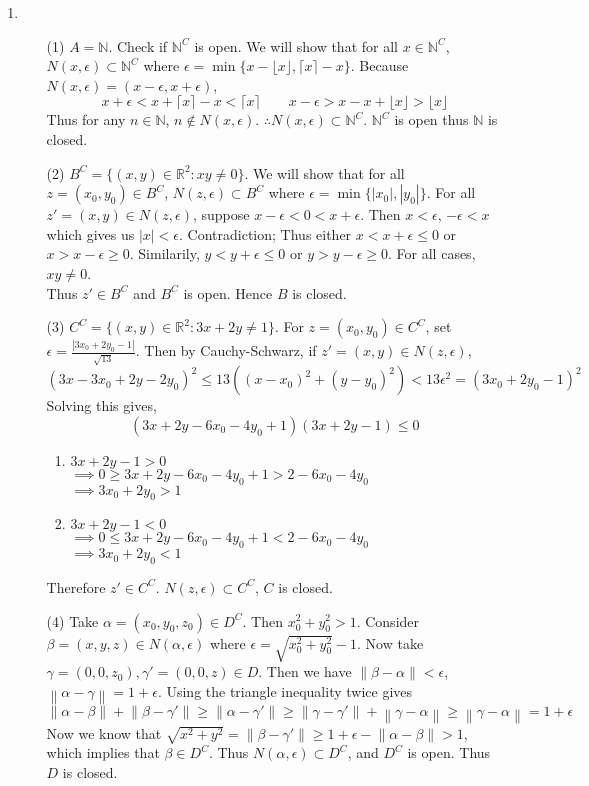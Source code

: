 \documentclass[12pt]{report}
\newcommand{\numl}[1]{\item[\large\textbf{\sffamily #1.}]}
\newcommand{\bb}[1]{\mathbb{#1}}
\newcommand{\norm}[1]{\left\lVert#1\right\rVert}
\newcommand{\abs}[1]{\left|#1\right|}
\newcommand{\ds}{\displaystyle}
\begin{document}
\begin{enumerate}
\numl{8}
\begin{enumerate}
	\item[(1)] $A = \bb{N}$. Check if $\bb{N}^C$ is open. We will show that for all $x\in \bb{N}^C$, $N(x, \epsilon)\subset \bb{N}^C$ where $\epsilon = \min\{x - \lfloor x \rfloor, \lceil x\rceil - x  \}$. Because $N(x, \epsilon) = (x - \epsilon, x +\epsilon)$,
	$$x + \epsilon < x + \lceil x\rceil - x < \lceil x\rceil \qquad x - \epsilon > x-x + \lfloor x \rfloor>  \lfloor x \rfloor $$
	Thus for any $n\in \bb{N}$, $n\notin N(x, \epsilon)$. $\therefore N(x, \epsilon) \subset \bb{N}^C$. $\bb{N}^C$ is open thus $\bb{N}$ is closed.
	\item [(2)] $B^C = \{(x, y)\in \bb{R}^2: xy\neq 0 \}$. We will show that for all $z = (x_0, y_0)\in B^C$, $N(z, \epsilon) \subset B^C$ where $\epsilon = \min\{\abs{x_0}, \abs{y_0} \}$.
	For all $z'=(x, y)\in N(z, \epsilon)$, suppose $x-\epsilon < 0 < x+ \epsilon$. Then $x < \epsilon$, $-\epsilon < x$ which gives us $\abs{x}<\epsilon$. Contradiction; Thus either $x <x +\epsilon \leq 0$ or $x > x - \epsilon \geq 0$. Similarily, $y < y +\epsilon \leq 0$ or $y > y - \epsilon \geq 0$. For all cases, $xy \neq 0$.\\
	Thus $z'\in B^C$ and $B^C$ is open. Hence $B$ is closed.
	\item[(3)] $C^C = \{(x, y)\in \bb{R}^2: 3x+2y\neq 1 \}$. For $z = (x_0, y_0)\in C^C$, set $\epsilon = \ds\frac{\abs{3x_0 +2y_0-1}}{\sqrt{13}}$. Then by Cauchy-Schwarz, if $z'=(x, y)\in N(z, \epsilon)$, $$(3x-3x_0+2y-2y_0)^2 \leq 13\left((x-x_0)^2 + (y-y_0)^2\right) < 13\epsilon^2 = (3x_0+2y_0-1)^2$$
	Solving this gives, $$(3x+2y-6x_0-4y_0+1)(3x+2y-1)\leq 0$$
	\begin{enumerate}
		\item $3x+2y - 1 > 0$\\
		$\implies 0 \geq 3x+2y-6x_0-4y_0+1 > 2 - 6x_0-4y_0$\\
		$\implies 3x_0+2y_0>1$
		\item $3x+2y - 1<0$\\
		$\implies 0 \leq 3x+2y-6x_0-4y_0+1 < 2 - 6x_0-4y_0$\\
		$\implies 3x_0+2y_0 <1$
	\end{enumerate}
	Therefore $z'\in C^C$. $N(z, \epsilon) \subset C^C$, $C$ is closed.
	\item[(4)] Take $\alpha = (x_0, y_0, z_0) \in D^C$. Then $x_0^2+y_0^2>1$. Consider $\beta = (x, y, z) \in N(\alpha, \epsilon)$ where $\epsilon = \sqrt{x_0^2+y_0^2} - 1$. Now take $\gamma = (0, 0, z_0), \gamma' = (0, 0, z) \in D$. Then we have $\norm{\beta-\alpha} <\epsilon$, $\norm{\alpha-\gamma} = 1 + \epsilon$. Using the triangle inequality twice gives $$\norm{\alpha-\beta} + \norm{\beta-\gamma'}\geq \norm{\alpha-\gamma'}\geq \norm{\gamma - \gamma'} + \norm{\gamma-\alpha} \geq \norm{\gamma-\alpha} = 1+\epsilon$$
	Now we know that $\sqrt{x^2+y^2} = \norm{\beta - \gamma'} \geq 1+\epsilon - \norm{\alpha-\beta} > 1$, which implies that $\beta \in D^C$. Thus $N(\alpha, \epsilon) \subset D^C$, and $D^C$ is open. Thus $D$ is closed.

\end{enumerate}


\end{enumerate}
\end{document}
